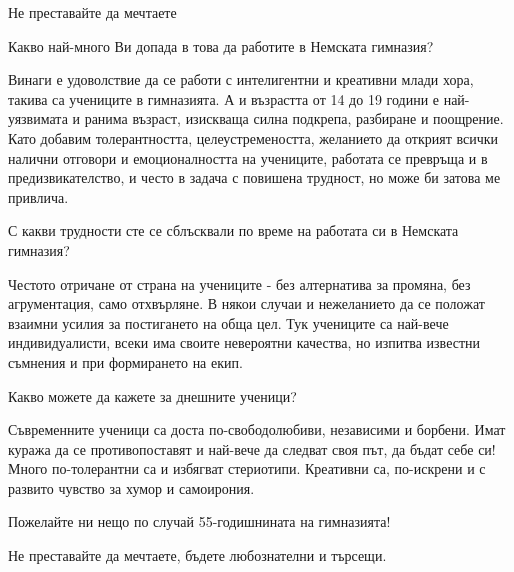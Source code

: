 \begin{multicols}{2} Не преставайте да мечтаете

\noindent \begin{window} \end{window}

Какво най-много Ви допада в това да работите в Немската гимназия? 

Винаги е удоволствие да се работи с интелигентни и креативни млади хора, такива са учениците в гимназията. А и възрастта от 14 до 19 години е най-уязвимата и ранима възраст, изискваща силна подкрепа, разбиране и поощрение. Като добавим толерантността, целеустремеността, желанието да открият всички налични отговори и емоционалността на учениците, работата се превръща и в предизвикателство, и често в задача с повишена трудност, но може би затова ме привлича. 

С какви трудности сте се сблъсквали по време на работата си в Немската гимназия?

Честото отричане от страна на учениците - без алтернатива за промяна, без агрументация, само отхвърляне. В някои случаи и нежеланието да се положат взаимни усилия за постигането на обща цел. Тук учениците са най-вече индивидуалисти, всеки има своите невероятни качества, но изпитва известни съмнения и при формирането на екип. 

Какво можете да кажете за днешните ученици? 

Съвременните ученици са доста по-свободолюбиви, независими и борбени. Имат куража да се противопоставят и най-вече да следват своя път, да бъдат себе си! Много по-толерантни са и избягват стериотипи. Креативни са, по-искрени и с развито чувство за хумор и самоирония.

Пожелайте ни нещо по случай 55-годишнината на гимназията! 

Не преставайте да мечтаете, бъдете любознателни и търсещи.

\end{multicols}
